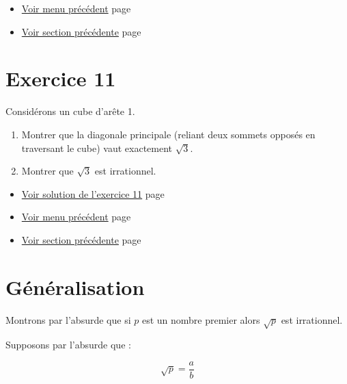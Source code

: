 \documentclass[a4paper,11pt]{book}
\begin{document}
\begin{enumerate}
\clearpage

\begin{itemize}
\item \hyperref[orgc112f4f]{Voir menu précédent}
page~\pageref{page:content6-menu}
\item \hyperref[orgb8d930f]{Voir section précédente}
page~\pageref{page:sec2.6.4irr}
\end{itemize}


\clearpage
\end{enumerate}

\section{Exercice 11}
\label{sec:orge303421}
\label{org1486a04}
\label{page:sec2.6.5exo11}

Considérons un cube d'arête 1.

\begin{enumerate}
\item Montrer que la diagonale principale (reliant deux sommets opposés
en traversant le cube) vaut exactement \(\sqrt{3}\).
\item Montrer que \(\sqrt{3}\) est irrationnel.
\end{enumerate}



\begin{itemize}
\item \hyperref[orgc0eae64]{Voir solution de l'exercice 11}
page~\pageref{page:sec8.6.2sol11}
\item \hyperref[orgc112f4f]{Voir menu précédent}
page~\pageref{page:content6-menu}
\item \hyperref[orgea5a5bb]{Voir section précédente}
page~\pageref{page:sqrt2proofs}
\end{itemize}


\clearpage

\section{Généralisation}
\label{sec:org96af429}
\label{org24a50ec}
\label{page:sec2.6.6gen}

Montrons par l'absurde que si \(p\)
est un nombre premier alors \(\sqrt{p}\) est
irrationnel.

Supposons par l'absurde que :

\[\sqrt{p} = \dfrac{a}{b}\]
\end{document}
